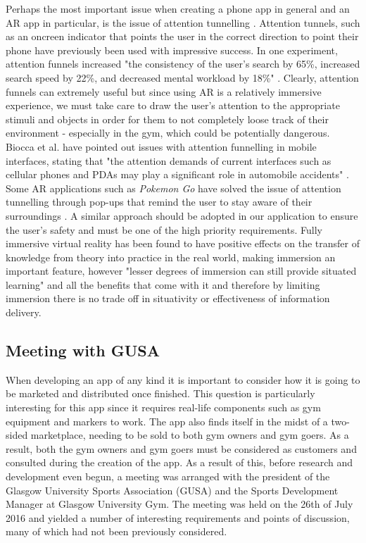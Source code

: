 \documentclass{l4proj}
\begin{document}
Perhaps the most important issue when creating a phone app in general and an AR app in particular, is the issue of attention tunnelling \cite{radu_why_2012} \cite{biocca_attention_2007}. Attention tunnels, such as an oncreen indicator that points the user in the correct direction to point their phone have previously been used with impressive success\cite{biocca_attention_2007}. In one experiment, attention funnels increased "the consistency of the user’s search by 65\%,  increased search speed by 22\%, and decreased mental workload by 18\%" \cite{biocca_attention_2007}. Clearly, attention funnels can extremely useful but since using AR is a relatively immersive experience, we must take care to draw the user's attention to the appropriate stimuli and objects in order for them to not completely loose track of their environment - especially in the gym, which could be potentially dangerous. Biocca et al. have pointed out issues with attention funnelling in mobile interfaces, stating that "the attention demands of current interfaces such as cellular phones and PDAs may play a significant role in automobile accidents" \cite{biocca_attention_2006}. Some AR applications such as \textit{Pokemon Go} have solved the issue of attention tunnelling through pop-ups that remind the user to stay aware of their surroundings \cite{hollister_drivers_2016}. A similar approach should be adopted in our application to ensure the user's safety and must be one of the high priority requirements. Fully immersive virtual reality has been found to have positive effects on the transfer of knowledge from theory into practice in the real world\cite{dede_immersive_2009}, making immersion an important feature, however "lesser degrees of immersion can still provide situated learning" and all the benefits that come with it\cite{dede_immersive_2009} and therefore by limiting immersion there is no trade off in situativity or effectiveness of information delivery.




\subsection{Meeting with GUSA}
\label{subsection:GUSA}
When developing an app of any kind it is important to consider how it is going to be marketed and distributed once finished. This question is particularly interesting for this app since it requires real-life components such as gym equipment and markers to work. The app also finds itself in the midst of a two-sided marketplace, needing to be sold to both gym owners and gym goers. As a result, both the gym owners and gym goers must be considered as customers and consulted during the creation of the app. As a result of this, before research and development even begun, a meeting was arranged with the president of the Glasgow University Sports Association (GUSA) and the Sports Development Manager at Glasgow University Gym. The meeting was held on the 26th of July 2016 and yielded a number of interesting requirements and points of discussion, many of which had not been previously considered. 
\end{document}
